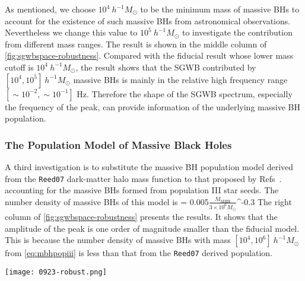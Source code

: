 As mentioned, we choose $10^4 ~h^{-1} M_\odot$ to be the minimum mass of massive \acp{BH} to account for the existence of such massive \acp{BH} from astronomical observations.
Nevertheless we change this value to $10^5 ~h^{-1} M_\odot$ to investigate the contribution from different mass ranges.
The result is shown in the middle column of \cref{fig:sgwbspace-robustness}.
Compared with the fiducial result whose lower mass cutoff is $10^4~h^{-1} M_\odot$, the result shows that the \ac{SGWB} contributed by $[10^4,10^5]~h^{-1} M_\odot$ massive \acp{BH} is mainly in the relative high frequency range $[\sim10^{-2}, \sim10^{-1}]$ Hz.
Therefore the shape of the \ac{SGWB} spectrum, especially the frequency of the peak, can provide information of the underlying massive \ac{BH} population. 

\subsubsection{The Population Model of Massive Black Holes}

A third investigation is to substitute the massive \ac{BH} population model derived from the \texttt{Reed07} dark-matter halo mass function to that proposed by Refs~.\cite{Barausse:2012fy,Sesana:2014bea,Antonini:2015cqa,Antonini:2015sza} accounting for the massive \acp{BH} formed from population III star seeds.
The number density of massive \acp{BH} of this model is
\be\label{eq:mbhpopiii}
 = 0.005\( \frac{M_\mathrm{MBH}}{3\times 10^6 M_\odot}\)^{-0.3} 
\ee 
The right column of \cref{fig:sgwbspace-robustness} presents the results.
It shows that the amplitude of the peak is one order of magnitude smaller than the fiducial model.
This is because the number density of massive \acp{BH} with mass $[10^4,10^6]~h^{-1} M_\odot$ from \cref{eq:mbhpopiii} is less than that from the \texttt{Reed07} derived population.

\begin{figure*}[htbp]
   \centering
   \texttt{[image: 0923-robust.png]}
\caption{The effect on \ac{SGWB} spectra from the modeling systematics of massive \ac{BH}. 
The three figures present the \ac{SGWB} by varying the redshift integral limits, the lower mass of massive \acp{BH} and the massive \ac{BH} population model, respectively.
All \ac{SGWB} spectra are calculated from $\gamma=2$ dark-matter spike distribution and $f_\text{PBH} = 10^{-8}$, $m_\text{PBH} = 1 M_\odot$.}
\label{fig:sgwbspace-robustness}
\end{figure*}

